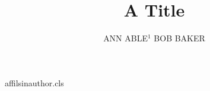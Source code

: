 \begin{filecontents*}[overwrite]{affilsinauthor.cls}
\def\affilfont{\small}
\def\author#1{\gdef\@author{#1}}
\def\affil#1{\gdef\@affil{#1}\ifx\@affil\@empty\else{\reset@font\affilfont\unskip,\ #1\vphantom{gy}\endgraf}\fi}\affil{}
\def\maketitle{\par{\Large\@title\par}{\noindent\@author\par}}
\end{filecontents*}
\documentclass{affilsinauthor}

\title{A Title}
\author{ANN ABLE$^1$  BOB BAKER }
\maketitle
Body.

